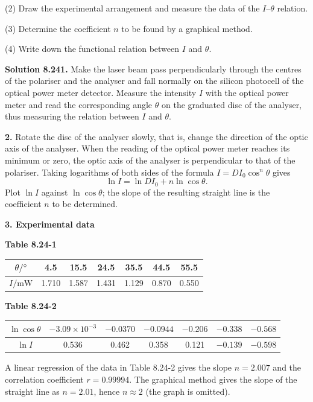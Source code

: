(2) Draw the experimental arrangement and measure the data of the $I$--$\theta$ relation.

(3) Determine the coefficient $n$ to be found by a graphical method.

(4) Write down the functional relation between $I$ and $\theta$.

\textbf{Solution 8.24}\quad \textbf{1.} Make the laser beam pass perpendicularly through the centres of the polariser and the analyser and fall normally on the silicon photocell of the optical power meter detector. Measure the intensity $I$ with the optical power meter and read the corresponding angle $\theta$ on the graduated disc of the analyser, thus measuring the relation between $I$ and $\theta$.

\textbf{2.} Rotate the disc of the analyser slowly, that is, change the direction of the optic axis of the analyser. When the reading of the optical power meter reaches its minimum or zero, the optic axis of the analyser is perpendicular to that of the polariser. Taking logarithms of both sides of the formula $I=DI_0\cos^n\theta$ gives
\[
\ln I=\ln DI_0+n\ln\cos\theta.
\]
Plot $\ln I$ against $\ln\cos\theta$; the slope of the resulting straight line is the coefficient $n$ to be determined.

\textbf{3. Experimental data}

\begin{center}
\textbf{Table 8.24-1}\\[3pt]
\begin{tabular}{ccccccc}
\toprule
$\theta/^{\circ}$ & 4.5 & 15.5 & 24.5 & 35.5 & 44.5 & 55.5 \\
\midrule
$I/\mathrm{mW}$ & 1.710 & 1.587 & 1.431 & 1.129 & 0.870 & 0.550 \\
\bottomrule
\end{tabular}
\end{center}

\begin{center}
\textbf{Table 8.24-2}\\[3pt]
\begin{tabular}{ccccccc}
\toprule
$\ln\cos\theta$ & $-3.09\times10^{-3}$ & $-0.0370$ & $-0.0944$ & $-0.206$ & $-0.338$ & $-0.568$ \\
\midrule
$\ln I$ & 0.536 & 0.462 & 0.358 & 0.121 & $-0.139$ & $-0.598$ \\
\bottomrule
\end{tabular}
\end{center}

A linear regression of the data in Table 8.24-2 gives the slope $n=2.007$ and the correlation coefficient $r=0.99994$. The graphical method gives the slope of the straight line as $n=2.01$, hence $n\approx2$ (the graph is omitted).

